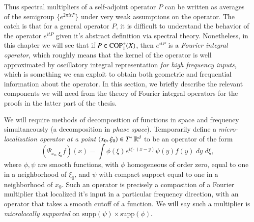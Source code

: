 Thus spectral multipliers of a self-adjoint operator $P$ can be written as averages of the semigroup $\{ e^{2 \pi i t P} \}$ under very weak assumptions on the operator. The catch is that for a general operator $P$, it is difficult to understand the behavior of the operator $e^{i t P}$ given it's abstract definition via spectral theory. Nonetheless, in this chapter we will see that if $P \in {\text{COP}^{+}_{{1}}}(X)$, then $e^{i t P}$ is a \emph{Fourier integral operator}, which roughly means that the kernel of the operator is well approximated by oscillatory integral representation \emph{for high frequency inputs}, which is something we can exploit to obtain both geometric and frequential information about the operator. In this section, we briefly describe the relevant components we will need from the theory of Fourier integral operators for the proofs in the latter part of the thesis.

We will require methods of decomposition of functions in space and frequency simultaneously (a decomposition in \emph{phase space}). Temporarily define a \emph{micro-localization operator at a point $(x_0,\xi_0) \in T^* \operatorname{\mathbb{R}}^d$} to be an operator of the form
%
\begin{equation}
  (\Psi_{x_0,\xi_0} f)(x) = \int \phi( \xi ) e^{i \xi \cdot (x - y)} \psi(y) f(y)\; dy\; d\xi,
\end{equation}
%
where $\phi,\psi$ are smooth functions, with $\phi$ homogeneous of order zero, equal to one in a neighborhood of $\xi_0$, and $\psi$ with compact support equal to one in a neighborhood of $x_0$. Such an operator is precisely a composition of a Fourier multiplier that localized it's input in a particular frequency direction, with an operator that takes a smooth cutoff of a function. We will say such a multiplier is \emph{microlocally supported} on $\text{supp}(\psi) \times \text{supp}(\phi)$.

